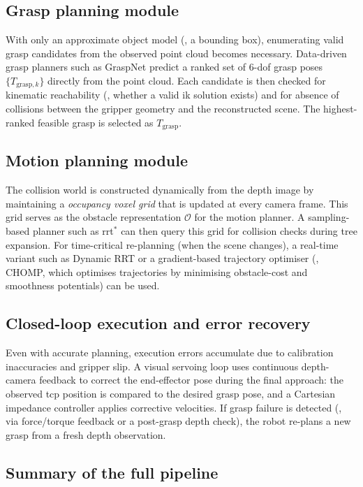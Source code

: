 \documentclass{article}
\begin{document}
\subsection{Grasp planning module}

With only an approximate object model (\eg, a bounding box), enumerating valid grasp candidates
from the observed point cloud becomes necessary.
Data-driven grasp planners such as GraspNet \citep{fang2020graspnet} predict a ranked set of
6-\ac{dof} grasp poses $\{T_{\text{grasp},k}\}$ directly from the point cloud.
Each candidate is then checked for kinematic reachability (\ie, whether a valid \ac{ik}
solution exists) and for absence of collisions between the gripper geometry and the
reconstructed scene.
The highest-ranked feasible grasp is selected as $T_{\text{grasp}}$.

\subsection{Motion planning module}

The collision world is constructed dynamically from the depth image by maintaining a
\emph{occupancy voxel grid} that is updated at every camera frame.
This grid serves as the obstacle representation $\mathcal{O}$ for the motion planner.
A sampling-based planner such as \ac{rrt}$^*$ \citep{karaman2011sampling} can then query
this grid for collision checks during tree expansion.
For time-critical re-planning (when the scene changes), a real-time variant such as
Dynamic RRT or a gradient-based trajectory optimiser (\eg, CHOMP, which optimises
trajectories by minimising obstacle-cost and smoothness potentials) can be used.

\subsection{Closed-loop execution and error recovery}

Even with accurate planning, execution errors accumulate due to calibration inaccuracies
and gripper slip.
A visual servoing loop uses continuous depth-camera feedback to correct the end-effector
pose during the final approach: the observed \ac{tcp} position is compared to the desired
grasp pose, and a Cartesian impedance controller applies corrective velocities.
If grasp failure is detected (\eg, via force/torque feedback or a post-grasp depth check),
the robot re-plans a new grasp from a fresh depth observation.

\subsection{Summary of the full pipeline}
\end{document}
